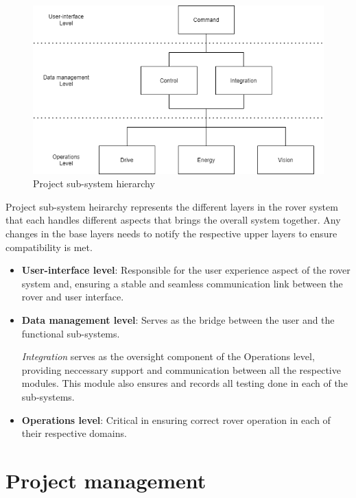 \documentclass[10pt, a4paper]{article}
\begin{document}
\begin{figure} [h!]
    \centering
    \includegraphics[scale=0.6]{project heirarchy.png}
    \caption{Project sub-system hierarchy}
\end{figure}

Project sub-system heirarchy represents the different layers in the rover system that each handles different aspects that brings the overall system together. Any changes in the base layers needs to notify the respective upper layers to ensure compatibility is met.

\begin{itemize}  
    \item \textbf{User-interface level}: Responsible for the user experience aspect of the rover system and, ensuring a stable and seamless communication link between the rover and user interface. 
    
    \item \textbf{Data management level}: Serves as the bridge between the user and the functional sub-systems. 
    
    \textit{Integration} serves as the oversight component of the Operations level, providing neccessary support and communication between all the respective modules. This module also ensures and records all testing done in each of the sub-systems.

    \item \textbf{Operations level}: Critical in ensuring correct rover operation in each of their respective domains. 
\end{itemize}

\pagebreak

\section{Project management}
\end{document}
